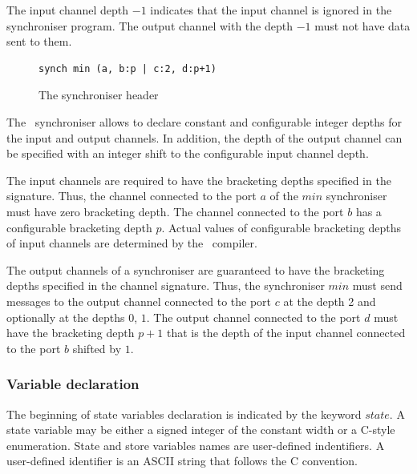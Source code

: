The input channel depth $-1$ indicates that the input channel is ignored in the synchroniser program. The output channel with the depth $-1$ must not have data sent to them.

\begin{figure}[h!]
\begin{lstlisting}[frame=single]
synch min (a, b:p | c:2, d:p+1)
\end{lstlisting}
\caption{The synchroniser header}
\label{min_sync_head}
\end{figure}


The \ak\ synchroniser allows to declare constant and configurable integer depths for the input and output channels. In addition, the depth of the output channel can be specified with an integer shift to the configurable input channel depth.

The input channels are required to have the bracketing depths specified in the signature. Thus, the channel connected to the port $a$ of the $min$ synchroniser must have zero bracketing depth. The channel connected to the port $b$ has a configurable bracketing depth $p$. Actual values of configurable bracketing depths of input channels are determined by the \ak\ compiler. %

The output channels of a synchroniser are guaranteed to have the bracketing depths specified in the channel signature. Thus, the synchroniser $min$ must send messages to the output channel connected to the port $c$ at the depth 2 and optionally at the depths $0$, $1$. The output channel connected to the port $d$ must have the bracketing depth $p+1$ that is the depth of the input channel connected to the port $b$ shifted by $1$.


  \subsubsection{Variable declaration}
The beginning of state variables declaration is indicated by the keyword $state$. A state variable may be either a signed integer of the constant width or a C-style enumeration. State and store variables names are user-defined indentifiers. A user-defined identifier is an ASCII string that follows the C convention.

